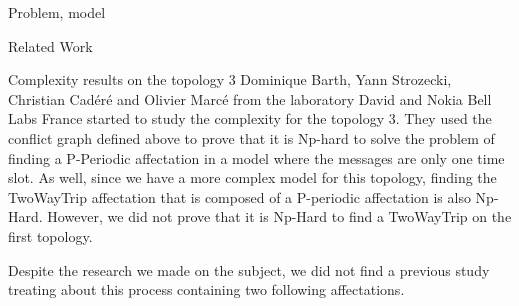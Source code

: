 \documentclass[a4paper,10pt]{report}
\begin{document}
\begin{chapter}{Problem, model}
\begin{section}{Related Work}
\begin{subsection}{Complexity results on the topology 3}
 Dominique Barth, Yann Strozecki, Christian Cadéré and Olivier Marcé from the laboratory David and Nokia Bell Labs France started to study the complexity for the topology 3.
 They used the conflict graph defined above to prove that it is Np-hard to solve the problem of finding a P-Periodic affectation in a model where the
 messages are only one time slot. As well, since we have a more complex model for this topology, finding the TwoWayTrip affectation
 that is composed of a P-periodic affectation is also Np-Hard. However, we did not prove that it is Np-Hard to find
 a TwoWayTrip on the first topology.
\end{subsection}

 \end{section}

Despite the research we made on the subject, we did not find a previous study treating about this process containing two 
following affectations.
\end{chapter}
\end{document}
